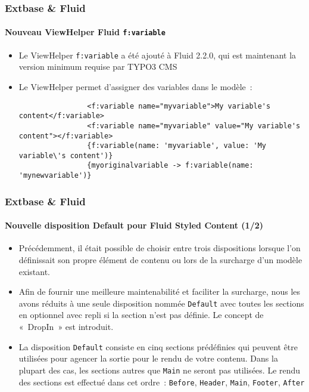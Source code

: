 \begin{frame}[fragile]
	\frametitle{Extbase \& Fluid}
	\framesubtitle{Nouveau ViewHelper Fluid \texttt{f:variable}}

	\begin{itemize}

		\item Le ViewHelper \texttt{f:variable} a été ajouté à Fluid 2.2.0,
			qui est maintenant la version minimum requise par TYPO3 CMS

		\item Le ViewHelper permet d'assigner des variables dans le modèle~:

			\begin{lstlisting}
				<f:variable name="myvariable">My variable's content</f:variable>
				<f:variable name="myvariable" value="My variable's content"></f:variable>
				{f:variable(name: 'myvariable', value: 'My variable\'s content')}
				{myoriginalvariable -> f:variable(name: 'mynewvariable')}
			\end{lstlisting}

	\end{itemize}

\end{frame}


\begin{frame}[fragile]
	\frametitle{Extbase \& Fluid}
	\framesubtitle{Nouvelle disposition Default pour Fluid Styled Content (1/2)}

	\begin{itemize}
		\item Précédemment, il était possible de choisir entre trois dispositions
			lorsque l'on définissait son propre élément de contenu ou lors de la
			surcharge d'un modèle existant.

		\item Afin de fournir une meilleure maintenabilité et faciliter la surcharge,
			nous les avons réduits à une seule disposition nommée \texttt{Default}
			avec toutes les sections en optionnel avec repli si la section n'est
			pas définie. Le concept de «~DropIn~» est introduit.

		\item La disposition \texttt{Default} consiste en cinq sections prédéfinies qui
		 	peuvent être utilisées pour agencer la sortie pour le rendu de votre contenu.
		 	Dans la plupart des cas, les sections autres que \texttt{Main} ne seront pas
		 	utilisées. Le rendu des sections est effectué dans cet ordre~:
			\texttt{Before}, \texttt{Header}, \texttt{Main}, \texttt{Footer}, \texttt{After}
	\end{itemize}

\end{frame}

